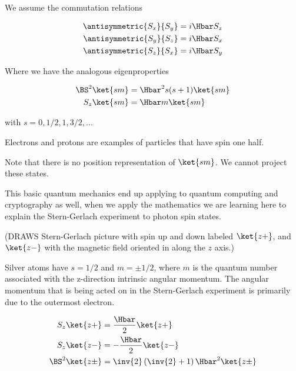 We assume the commutation relations

\begin{equation}\label{eqn:PHY356Foct19:2000}
\begin{aligned}
\antisymmetric{S_x}{S_y} &= i \Hbar S_z \\
\antisymmetric{S_y}{S_z} &= i \Hbar S_x \\
\antisymmetric{S_z}{S_x} &= i \Hbar S_y
\end{aligned}
\end{equation}

Where we have the analogous eigenproperties

\begin{equation}\label{eqn:PHY356Foct19:2001}
\begin{aligned}
\BS^2 \ket{sm} &= \Hbar^2 s(s+1) \ket{sm} \\
S_z \ket{sm} &= \Hbar m \ket{sm}
\end{aligned}
\end{equation}

with \(s = 0, 1/2, 1, 3/2, ...\)

Electrons and protons are examples of particles that have spin one half.

Note that there is no position representation of \(\ket{sm}\).  We cannot project these states.

This basic quantum mechanics end up applying to quantum computing and cryptography as well, when we apply the mathematics we are learning here to explain the Stern-Gerlach experiment to photon spin states.

(DRAWS Stern-Gerlach picture with spin up and down labeled \(\ket{z+}\), and \(\ket{z-}\) with the magnetic field oriented in along the \(z\) axis.)

Silver atoms have \(s = 1/2\) and \(m= \pm 1/2\), where \(m\) is the quantum number associated with the z-direction intrinsic angular momentum.  The angular momentum that is being acted on in the Stern-Gerlach experiment is primarily due to the outermost electron.

\begin{equation}\label{eqn:PHY356Foct19:2005}
\begin{aligned}
S_z \ket{z+} &= \frac{\Hbar}{2} \ket{z+} \\
S_z \ket{z-} &= -\frac{\Hbar}{2} \ket{z-} \\
\BS^2 \ket{z\pm} &= \inv{2} \left( \inv{2} + 1 \right) \Hbar^2 \ket{z\pm}
\end{aligned}
\end{equation}

